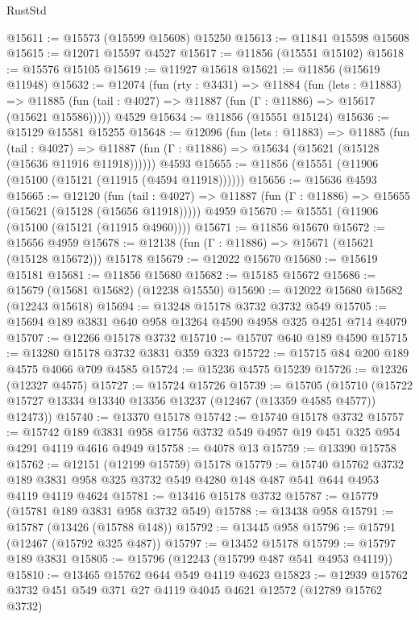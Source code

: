 \begin{lexlean}{RustStd}
\begin{coremodule}
@15611 := @15573 (@15599 @15608) @15250
@15613 := @11841 @15598 @15608
@15615 := @12071 @15597 @4527
@15617 := @11856 (@15551 @15102)
@15618 := @15576 @15105
@15619 := @11927 @15618
@15621 := @11856 (@15619 @11948)
@15632 := @12074
    (fun (rty : @3431) =>
    @11884
      (fun (lets : @11883) =>
      @11885 (fun (tail : @4027) => @11887 (fun (Γ : @11886) => @15617 (@15621 @15586)))))
    @4529
@15634 := @11856 (@15551 @15124)
@15636 := @15129 @15581 @15255
@15648 := @12096
    (fun (lets : @11883) =>
    @11885
      (fun (tail : @4027) =>
      @11887 (fun (Γ : @11886) => @15634 (@15621 (@15128 (@15636 @11916 @11918))))))
    @4593
@15655 := @11856 (@15551 (@11906 (@15100 (@15121 (@11915 (@4594 @11918))))))
@15656 := @15636 @4593
@15665 := @12120
    (fun (tail : @4027) => @11887 (fun (Γ : @11886) => @15655 (@15621 (@15128 (@15656 @11918)))))
    @4959
@15670 := @15551 (@11906 (@15100 (@15121 (@11915 @4960))))
@15671 := @11856 @15670
@15672 := @15656 @4959
@15678 := @12138 (fun (Γ : @11886) => @15671 (@15621 (@15128 @15672))) @15178
@15679 := @12022 @15670
@15680 := @15619 @15181
@15681 := @11856 @15680
@15682 := @15185 @15672
@15686 := @15679 (@15681 @15682) (@12238 @15550)
@15690 := @12022 @15680 @15682 (@12243 @15618)
@15694 := @13248 @15178 @3732 @3732 @549
@15705 := @15694 @189 @3831 @640 @958 @13264 @4590 @4958 @325 @4251 @714 @4079
@15707 := @12266 @15178 @3732
@15710 := @15707 @640 @189 @4590
@15715 := @13280 @15178 @3732 @3831 @359 @323
@15722 := @15715 @84 @200 @189 @4575 @4066 @709 @4585
@15724 := @15236 @4575 @15239
@15726 := @12326 (@12327 @4575)
@15727 := @15724 @15726
@15739 := @15705
    (@15710 (@15722 @15727 @13334 @13340 @13356 @13237 (@12467 (@13359 @4585 @4577)) @12473))
@15740 := @13370 @15178
@15742 := @15740 @15178 @3732
@15757 := @15742 @189 @3831 @958 @1756 @3732 @549 @4957 @19 @451 @325 @954 @4291 @4119 @4616 @4949
@15758 := @4078 @13
@15759 := @13390 @15758
@15762 := @12151 (@12199 @15759) @15178
@15779 := @15740
    @15762
    @3732
    @189
    @3831
    @958
    @325
    @3732
    @549
    @4280
    @148
    @487
    @541
    @644
    @4953
    @4119
    @4119
    @4624
@15781 := @13416 @15178 @3732
@15787 := @15779 (@15781 @189 @3831 @958 @3732 @549)
@15788 := @13438 @958
@15791 := @15787 (@13426 (@15788 @148))
@15792 := @13445 @958
@15796 := @15791 (@12467 (@15792 @325 @487))
@15797 := @13452 @15178
@15799 := @15797 @189 @3831
@15805 := @15796 (@12243 (@15799 @487 @541 @4953 @4119))
@15810 := @13465 @15762 @644 @549 @4119 @4623
@15823 := @12939 @15762 @3732 @451 @549 @371 @27 @4119 @4045 @4621 @12572 (@12789 @15762 @3732)

\end{coremodule}
\end{lexlean}

